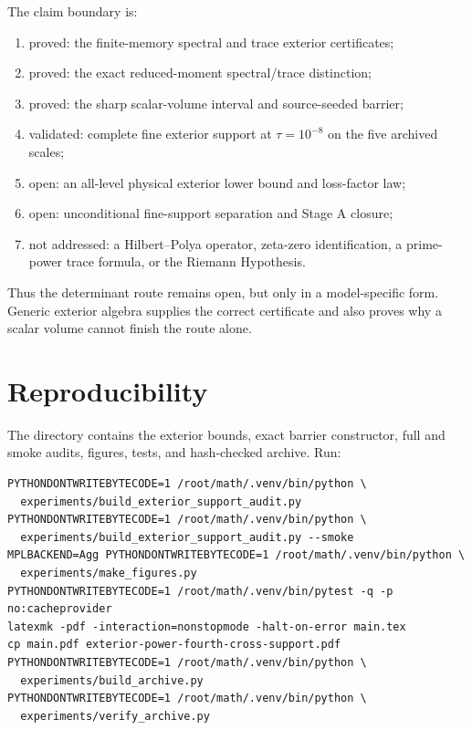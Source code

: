 \documentclass[11pt]{article}
\theoremstyle{definition}
\theoremstyle{remark}
\begin{document}
The claim boundary is:
\begin{enumerate}[leftmargin=2.2em]
 \item proved: the finite-memory spectral and trace exterior certificates;
 \item proved: the exact reduced-moment spectral/trace distinction;
 \item proved: the sharp scalar-volume interval and source-seeded barrier;
 \item validated: complete fine exterior support at $\tau=10^{-8}$ on the
       five archived scales;
 \item open: an all-level physical exterior lower bound and loss-factor law;
 \item open: unconditional fine-support separation and Stage A closure;
 \item not addressed: a Hilbert--Polya operator, zeta-zero identification,
       a prime-power trace formula, or the Riemann Hypothesis.
\end{enumerate}

Thus the determinant route remains open, but only in a model-specific form.
Generic exterior algebra supplies the correct certificate and also proves
why a scalar volume cannot finish the route alone.

\section{Reproducibility}

The directory contains the exterior bounds, exact barrier constructor, full
and smoke audits, figures, tests, and hash-checked archive.  Run:
\begin{verbatim}
PYTHONDONTWRITEBYTECODE=1 /root/math/.venv/bin/python \
  experiments/build_exterior_support_audit.py
PYTHONDONTWRITEBYTECODE=1 /root/math/.venv/bin/python \
  experiments/build_exterior_support_audit.py --smoke
MPLBACKEND=Agg PYTHONDONTWRITEBYTECODE=1 /root/math/.venv/bin/python \
  experiments/make_figures.py
PYTHONDONTWRITEBYTECODE=1 /root/math/.venv/bin/pytest -q -p no:cacheprovider
latexmk -pdf -interaction=nonstopmode -halt-on-error main.tex
cp main.pdf exterior-power-fourth-cross-support.pdf
PYTHONDONTWRITEBYTECODE=1 /root/math/.venv/bin/python \
  experiments/build_archive.py
PYTHONDONTWRITEBYTECODE=1 /root/math/.venv/bin/python \
  experiments/verify_archive.py
\end{verbatim}



\end{document}
